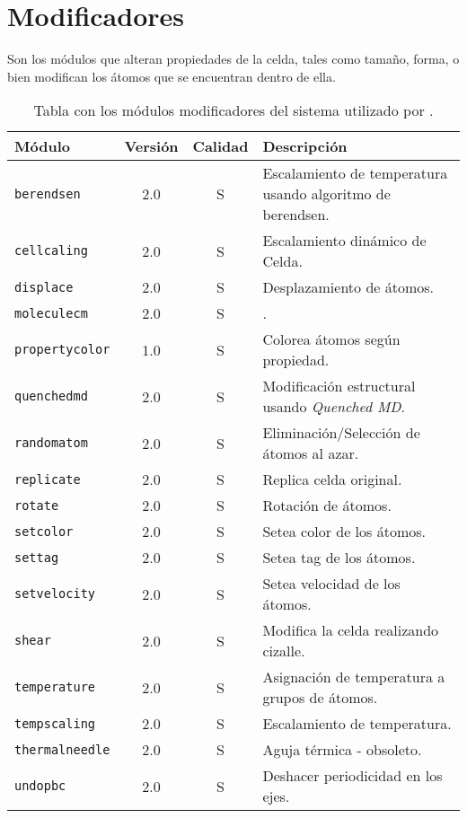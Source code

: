 \section{Modificadores}
Son los m\'odulos que alteran propiedades de la celda, tales como tama\~no, forma, o bien modifican los \'atomos que se encuentran dentro de ella.

\begin{table}[h!]\centering
 \begin{tabular}{|l|c|c|p{10cm}|}\hline
 M\'odulo & Versi\'on & Calidad & Descripci\'on \\
 \hline\hline
 \texttt{berendsen} & 2.0 & S & Escalamiento de temperatura usando algoritmo de berendsen.\\
 \hline
 \texttt{cellcaling} & 2.0 & S & Escalamiento din\'amico de Celda.\\
 \hline
 \texttt{displace} & 2.0 & S & Desplazamiento de \'atomos.\\
 \hline
 \texttt{moleculecm} & 2.0 & S & .\\
 \hline
 \texttt{propertycolor} & 1.0 & S & Colorea \'atomos seg\'un propiedad.\\
 \hline
 \texttt{quenchedmd} & 2.0 & S & Modificaci\'on estructural usando \textit{Quenched MD}.\\
 \hline
 \texttt{randomatom} & 2.0 & S & Eliminaci\'on/Selecci\'on de \'atomos al azar.\\
 \hline
 \texttt{replicate} & 2.0 & S & Replica celda original.\\
 \hline
 \texttt{rotate} & 2.0 & S & Rotaci\'on de \'atomos.\\
 \hline
 \texttt{setcolor} & 2.0 & S & Setea color de los \'atomos.\\
 \hline
 \texttt{settag} & 2.0 & S & Setea tag de los \'atomos.\\
 \hline
 \texttt{setvelocity} & 2.0 & S & Setea velocidad de los \'atomos.\\
 \hline
 \texttt{shear} & 2.0 & S & Modifica la celda realizando cizalle.\\
 \hline
 \texttt{temperature} & 2.0 & S & Asignaci\'on de temperatura a grupos de \'atomos.\\
 \hline
 \texttt{tempscaling} & 2.0 & S & Escalamiento de temperatura.\\
 \hline
 \texttt{thermalneedle} & 2.0 & S & Aguja t\'ermica - obsoleto.\\
 \hline
 \texttt{undopbc} & 2.0 & S & Deshacer periodicidad en los ejes.\\
 \hline
 \end{tabular}
\label{tab:modmodify}
\caption{Tabla con los m\'odulos modificadores del sistema utilizado por {\lpmd}.}
\end{table}

